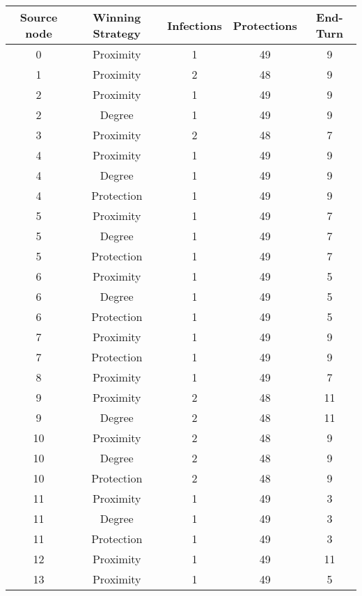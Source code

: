 \documentclass[results.tex]{subfiles}
\begin{document}
\begin{center}
  \begin{tabular}{| c || c | c | c | c |}
    \hline
    {\bfseries Source node} & {\bfseries Winning Strategy} & {\bfseries Infections} & {\bfseries Protections} & {\bfseries End-Turn} \\  %
    \hline\hline
    0 & Proximity & 1 & 49 & 9 \\ 
    \hline
    1 & Proximity & 2 & 48 & 9 \\ 
    \hline
    2 & Proximity & 1 & 49 & 9 \\ 
    \hline
    2 & Degree & 1 & 49 & 9 \\ 
    \hline
    3 & Proximity & 2 & 48 & 7 \\ 
    \hline
    4 & Proximity & 1 & 49 & 9 \\ 
    \hline
    4 & Degree & 1 & 49 & 9 \\ 
    \hline
    4 & Protection & 1 & 49 & 9 \\ 
    \hline
    5 & Proximity & 1 & 49 & 7 \\ 
    \hline
    5 & Degree & 1 & 49 & 7 \\ 
    \hline
    5 & Protection & 1 & 49 & 7 \\ 
    \hline
    6 & Proximity & 1 & 49 & 5 \\ 
    \hline
    6 & Degree & 1 & 49 & 5 \\ 
    \hline
    6 & Protection & 1 & 49 & 5 \\ 
    \hline
    7 & Proximity & 1 & 49 & 9 \\ 
    \hline
    7 & Protection & 1 & 49 & 9 \\ 
    \hline
    8 & Proximity & 1 & 49 & 7 \\ 
    \hline
    9 & Proximity & 2 & 48 & 11 \\ 
    \hline
    9 & Degree & 2 & 48 & 11 \\ 
    \hline
    10 & Proximity & 2 & 48 & 9 \\ 
    \hline
    10 & Degree & 2 & 48 & 9 \\ 
    \hline
    10 & Protection & 2 & 48 & 9 \\ 
    \hline
    11 & Proximity & 1 & 49 & 3 \\ 
    \hline
    11 & Degree & 1 & 49 & 3 \\ 
    \hline
    11 & Protection & 1 & 49 & 3 \\ 
    \hline
    12 & Proximity & 1 & 49 & 11 \\ 
    \hline
    13 & Proximity & 1 & 49 & 5 \\ 

\end{tabular}
\end{center}
\end{document}
